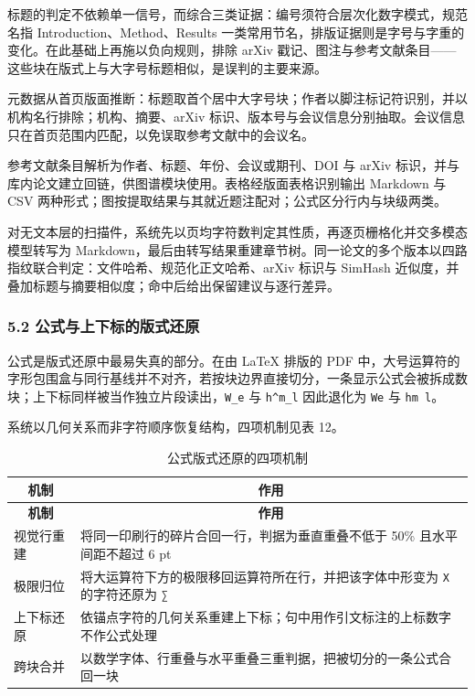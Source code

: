\documentclass[UTF8,fontset=windows,zihao=5,a4paper]{ctexart}
\begin{document}
标题的判定不依赖单一信号，而综合三类证据：编号须符合层次化数字模式，规范名指 Introduction、Method、Results 一类常用节名，排版证据则是字号与字重的变化。在此基础上再施以负向规则，排除 arXiv 戳记、图注与参考文献条目——这些块在版式上与大字号标题相似，是误判的主要来源。

元数据从首页版面推断：标题取首个居中大字号块；作者以脚注标记符识别，并以机构名行排除；机构、摘要、arXiv 标识、版本号与会议信息分别抽取。会议信息只在首页范围内匹配，以免误取参考文献中的会议名。

参考文献条目解析为作者、标题、年份、会议或期刊、DOI 与 arXiv 标识，并与库内论文建立回链，供图谱模块使用。表格经版面表格识别输出 Markdown 与 CSV 两种形式；图按提取结果与其就近题注配对；公式区分行内与块级两类。

对无文本层的扫描件，系统先以页均字符数判定其性质，再逐页栅格化并交多模态模型转写为 Markdown，最后由转写结果重建章节树。同一论文的多个版本以四路指纹联合判定：文件哈希、规范化正文哈希、arXiv 标识与 SimHash 近似度，并叠加标题与摘要相似度；命中后给出保留建议与逐行差异。

\subsubsection*{5.2 公式与上下标的版式还原}
公式是版式还原中最易失真的部分。在由 LaTeX 排版的 PDF 中，大号运算符的字形包围盒与同行基线并不对齐，若按块边界直接切分，一条显示公式会被拆成数块；上下标同样被当作独立片段读出，\texttt{W\_\allowbreak{}e} 与 \texttt{h\textasciicircum{}m\_\allowbreak{}l} 因此退化为 \texttt{We} 与 \texttt{hm l}。

系统以几何关系而非字符顺序恢复结构，四项机制见表 12。

\begin{longtable}{@{}p{}p{}@{}}
\caption{公式版式还原的四项机制}\\
\toprule
\multicolumn{1}{c}{\textbf{机制}} & \multicolumn{1}{c}{\textbf{作用}} \\
\midrule
\endfirsthead
\toprule
\multicolumn{1}{c}{\textbf{机制}} & \multicolumn{1}{c}{\textbf{作用}} \\
\midrule
\endhead
\bottomrule
\endfoot
视觉行重建 & 将同一印刷行的碎片合回一行，判据为垂直重叠不低于 50\% 且水平间距不超过 6 pt \\
极限归位 & 将大运算符下方的极限移回运算符所在行，并把该字体中形变为 \texttt{X} 的字符还原为 \texttt{∑} \\
上下标还原 & 依锚点字符的几何关系重建上下标；句中用作引文标注的上标数字不作公式处理 \\
跨块合并 & 以数学字体、行重叠与水平重叠三重判据，把被切分的一条公式合回一块 \\
\end{longtable}
\end{document}

